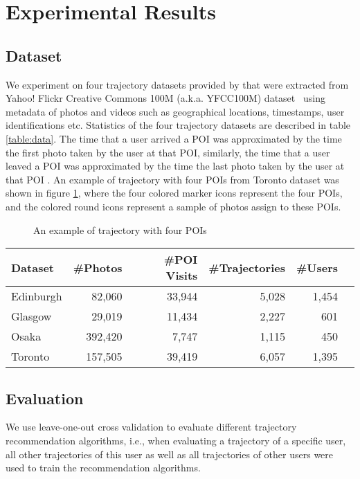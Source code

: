 \section{Experimental Results}
\label{experiment}

\subsection{Dataset}
\label{experiment:dataset}
We experiment on four trajectory datasets provided by \cite{ijcai15} that were
extracted from Yahoo! Flickr Creative Commons 100M (a.k.a. YFCC100M) dataset~\cite{thomee2016yfcc100m} 
using metadata of photos and videos such as geographical locations, timestamps, user identifications etc.
Statistics of the four trajectory datasets are described in table \ref{table:data}.
%
The time that a user arrived a POI was approximated by the time the first photo taken by the user at that POI,
similarly, the time that a user leaved a POI was approximated by the time the last photo taken by the user at 
that POI \cite{ht10, ijcai15}.
An example of trajectory with four POIs from Toronto dataset was shown in figure \ref{fig:traj}, 
where the four colored marker icons represent the four POIs, 
and the colored round icons represent a sample of photos assign to these POIs.


\begin{figure}
\centering
{}
\caption{An example of trajectory with four POIs}
\label{fig:traj}
\end{figure}

\begin{table*}
\centering
\begin{tabular}{lrrrrr} \hline
\textbf{Dataset} & \textbf{\#Photos} & \textbf{\#POI Visits} & \textbf{\#Trajectories} & \textbf{\#Users} \\ \hline
Edinburgh & 82,060 & 33,944 & 5,028 & 1,454 \\ 
Glasgow & 29,019 & 11,434 & 2,227 & 601 \\ 
Osaka & 392,420 & 7,747 & 1,115 & 450 \\ 
Toronto & 157,505 & 39,419 & 6,057 & 1,395 \\ 
\hline
\end{tabular}
\caption{Statistics of trajectory dataset}
\label{table:data}
\end{table*}


\subsection{Evaluation}
We use leave-one-out cross validation to evaluate different trajectory recommendation algorithms,
i.e., when evaluating a trajectory of a specific user, all other trajectories of this user as well as 
all trajectories of other users were used to train the recommendation algorithms.

